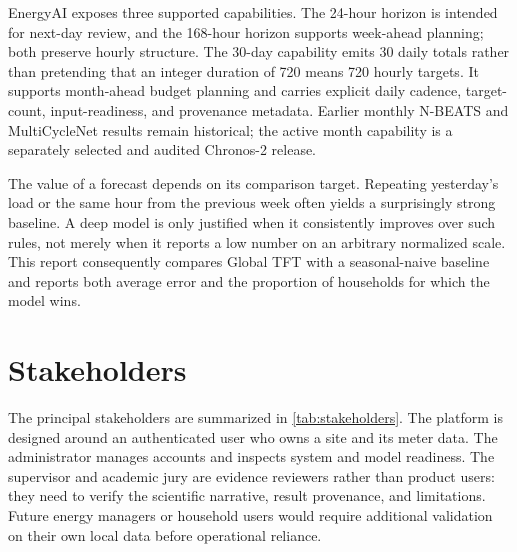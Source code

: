 EnergyAI exposes three supported capabilities. The 24-hour horizon is intended for next-day review, and the 168-hour horizon supports week-ahead planning; both preserve hourly structure. The 30-day capability emits 30 daily totals rather than pretending that an integer duration of 720 means 720 hourly targets. It supports month-ahead budget planning and carries explicit daily cadence, target-count, input-readiness, and provenance metadata. Earlier monthly N-BEATS and MultiCycleNet results remain historical; the active month capability is a separately selected and audited Chronos-2 release.

The value of a forecast depends on its comparison target. Repeating yesterday's load or the same hour from the previous week often yields a surprisingly strong baseline. A deep model is only justified when it consistently improves over such rules, not merely when it reports a low number on an arbitrary normalized scale. This report consequently compares Global TFT with a seasonal-naive baseline and reports both average error and the proportion of households for which the model wins.

\section{Stakeholders}

The principal stakeholders are summarized in \cref{tab:stakeholders}. The platform is designed around an authenticated user who owns a site and its meter data. The administrator manages accounts and inspects system and model readiness. The supervisor and academic jury are evidence reviewers rather than product users: they need to verify the scientific narrative, result provenance, and limitations. Future energy managers or household users would require additional validation on their own local data before operational reliance.


